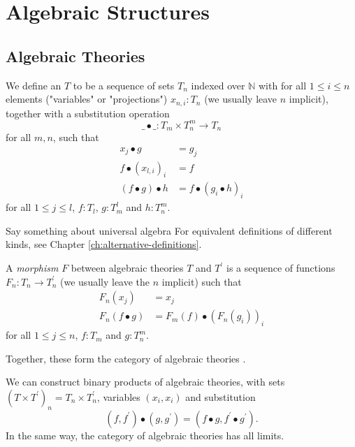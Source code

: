 \chapter{Algebraic Structures}

\section{Algebraic Theories}\label{sec:algebraic-theories}

\begin{definition}
  We define an  $ T $ to be a sequence of sets $ T_n $ indexed over $ \mathbb N $ with for all $ 1 \leq i \leq n $ elements ("variables" or "projections") $ x_{n, i}: T_n $ (we usually leave $ n $ implicit), together with a substitution operation
  \[ \_ \bullet \_: T_m \times T_n^m \to T_n \]
  for all $ m, n $, such that
  \begin{align*}
    x_j \bullet g &= g_j\\
    f \bullet (x_{l, i})_i &= f\\
    (f \bullet g) \bullet h &= f \bullet (g_i \bullet h)_i
  \end{align*}
  for all $ 1 \leq j \leq l $, $ f: T_l $, $ g: T_m^l $ and $ h: T_n^m $.
\end{definition}

\begin{remark}
  \TODO Say something about universal algebra
  For equivalent definitions of different kinds, see Chapter \ref{ch:alternative-definitions}.
\end{remark}

\begin{definition}
  A \textit{morphism} $ F $ between algebraic theories $ T $ and $ T^\prime $ is a sequence of functions $ F_n: T_n \to T^\prime_n $ (we usually leave the $ n $ implicit) such that
  \begin{align*}
    F_n(x_j) &= x_j\\
    F_n(f \bullet g) &= F_m(f) \bullet (F_n(g_i))_i
  \end{align*}
  for all $ 1 \leq j \leq n $, $ f: T_m $ and $ g: T_n^m $.
\end{definition}

Together, these form the category of algebraic theories \iindex{$ \AlgTh $}.

\begin{remark}
  We can construct binary products of algebraic theories, with sets $ (T \times T^\prime)_n = T_n \times T^\prime_n $, variables $ (x_i, x_i) $ and substitution
  \[ (f, f^\prime) \bullet (g, g^\prime) = (f \bullet g, f^\prime \bullet g^\prime). \]
  In the same way, the category of algebraic theories has all limits.
\end{remark}

